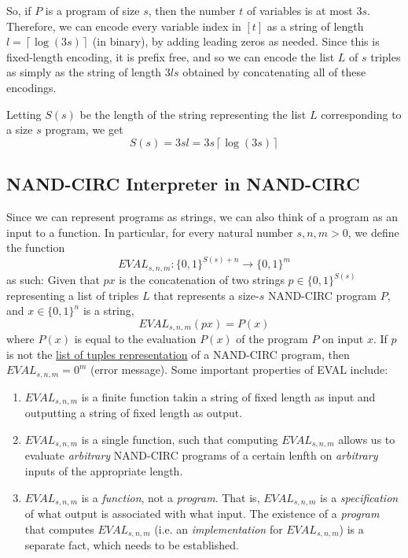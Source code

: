  So, if $P$ is a program of size $s$, then the number $t$ of variables is at most $3s$. Therefore, we can encode every variable index in $[t]$ as a string of length $l = \left\lceil{\log(3s)}\right\rceil$ (in binary), by adding leading zeros as needed. Since this is fixed-length encoding, it is prefix free, and so we can encode the list $L$ of $s$ triples as simply as the string of length $3ls$ obtained by concatenating all of these encodings. 

  Letting $S(s)$ be the length of the string representing the list $L$ corresponding to a size $s$ program, we get
  \begin{equation}
    S(s) = 3sl = 3s \left\lceil{\log(3s)}\right\rceil
  \end{equation}

\subsection{NAND-CIRC Interpreter in NAND-CIRC}

  Since we can represent programs as strings, we can also think of a program as an input to a function. In particular, for every natural number $s, n, m > 0$, we define the function
  \begin{equation}
    EVAL_{s, n, m} : \{0,1\}^{S(s) + n} \to \{0,1\}^m
  \end{equation}
  as such: Given that $px$ is the concatenation of two strings $p \in \{0,1\}^{S(s)}$ representing a list of triples $L$ that represents a size-$s$ NAND-CIRC program $P$, and $x \in \{0,1\}^n$ is a string, 
  \begin{equation}
    EVAL_{s, n, m} (px) = P(x)
  \end{equation}
  where $P(x)$ is equal to the evaluation $P(x)$ of the program $P$ on input $x$. If $p$ is not the \hyperref[def:list-of-tuples-representation]{list of tuples representation} of a NAND-CIRC program, then $EVAL_{s, n, m} = 0^m$ (error message). Some important properties of EVAL include: 
  \begin{enumerate}
      \item $EVAL_{s, n, m}$ is a finite function takin a string of fixed length as input and outputting a string of fixed length as output. 
      \item $EVAL_{s, n, m}$ is a single function, such that computing $EVAL_{s, n, m}$ allows us to evaluate \textit{arbitrary} NAND-CIRC programs of a certain lenfth on \textit{arbitrary} inputs of the appropriate length. 
      \item $EVAL_{s, n, m}$ is a \textit{function}, not a \textit{program}. That is, $EVAL_{s, n, m}$ is a \textit{specification} of what output is associated with what input. The existence of a \textit{program} that computes $EVAL_{s, n, m}$ (i.e. an \textit{implementation} for $EVAL_{s, n, m}$) is a separate fact, which needs to be established. 
  \end{enumerate}

